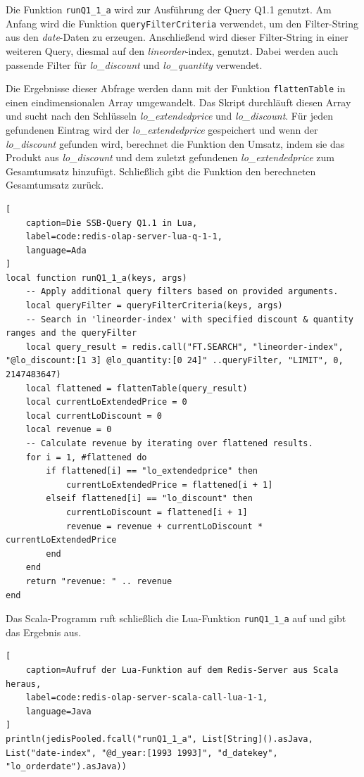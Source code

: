 Die Funktion \lstinline|runQ1_1_a| wird zur Ausführung der Query Q1.1 genutzt. Am Anfang wird die Funktion \lstinline|queryFilterCriteria| verwendet, um den Filter-String aus den \emph{date}-Daten zu erzeugen. Anschließend wird dieser Filter-String in einer weiteren Query, diesmal auf den \emph{lineorder}-index, genutzt. Dabei werden auch passende Filter für \emph{lo\_discount} und \emph{lo\_quantity} verwendet.

Die Ergebnisse dieser Abfrage werden dann mit der Funktion \lstinline|flattenTable| in einen eindimensionalen Array umgewandelt. Das Skript durchläuft diesen Array und sucht nach den Schlüsseln \emph{lo\_extendedprice} und \emph{lo\_discount}. Für jeden gefundenen Eintrag wird der \emph{lo\_extendedprice} gespeichert und wenn der \emph{lo\_discount} gefunden wird, berechnet die Funktion den Umsatz, indem sie das Produkt aus \emph{lo\_discount} und dem zuletzt gefundenen \emph{lo\_extendedprice} zum Gesam\-tumsatz hinzufügt.
Schließlich gibt die Funktion den berechneten Gesamt\-umsatz zurück.

\begin{lstlisting}[
    caption=Die SSB-Query Q1.1 in Lua,
    label=code:redis-olap-server-lua-q-1-1,
    language=Ada
]
local function runQ1_1_a(keys, args)
    -- Apply additional query filters based on provided arguments.
    local queryFilter = queryFilterCriteria(keys, args)
    -- Search in 'lineorder-index' with specified discount & quantity ranges and the queryFilter
    local query_result = redis.call("FT.SEARCH", "lineorder-index", "@lo_discount:[1 3] @lo_quantity:[0 24]" ..queryFilter, "LIMIT", 0, 2147483647)
    local flattened = flattenTable(query_result)
    local currentLoExtendedPrice = 0
    local currentLoDiscount = 0
    local revenue = 0
    -- Calculate revenue by iterating over flattened results.
    for i = 1, #flattened do
        if flattened[i] == "lo_extendedprice" then
            currentLoExtendedPrice = flattened[i + 1]
        elseif flattened[i] == "lo_discount" then
            currentLoDiscount = flattened[i + 1]
            revenue = revenue + currentLoDiscount * currentLoExtendedPrice
        end
    end
    return "revenue: " .. revenue
end
\end{lstlisting}

Das Scala-Programm ruft schließlich die Lua-Funktion \lstinline|runQ1_1_a| auf und gibt das Ergebnis aus.

\begin{lstlisting}[
    caption=Aufruf der Lua-Funktion auf dem Redis-Server aus Scala heraus,
    label=code:redis-olap-server-scala-call-lua-1-1,
    language=Java
]
println(jedisPooled.fcall("runQ1_1_a", List[String]().asJava, List("date-index", "@d_year:[1993 1993]", "d_datekey", "lo_orderdate").asJava))
\end{lstlisting}


